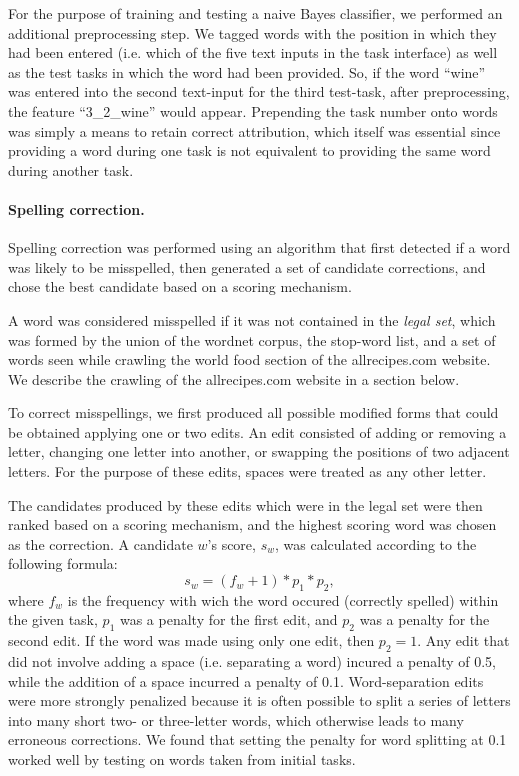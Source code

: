\documentclass[12pt]{article}
\begin{document}
	For the purpose of training and testing a naive Bayes classifier, we 
	performed an additional preprocessing step.  We tagged words with the
	position in which they had been entered (i.e. which of the five text 
	inputs in the task interface) as well as the test tasks in which the word 
	had been provided.
	So, if the word ``wine'' was entered into the second text-input for 
	the third test-task, after preprocessing, the feature ``3\_2\_wine'' would
	appear.  Prepending the task number onto words was simply a means to 
	retain correct attribution, which itself was essential since providing a
	word during one task is not equivalent to providing the same word during 
	another task.  
	
	\paragraph{Spelling correction.}  
	Spelling correction was performed using an algorithm that first detected
	if a word was likely to be misspelled, then generated a set of candidate 
	corrections, and chose the best candidate based on a scoring mechanism.
	
	A word was considered misspelled if it was not contained in the 
	\textit{legal set}, which was formed by the union of
	the wordnet corpus, the stop-word list, and a set of words seen while 
	crawling the world food section of the allrecipes.com website.  We
	describe the crawling of the allrecipes.com website in a section below.

	To correct misspellings, we first produced all possible modified forms 
	that could be obtained applying one or two edits.  An edit consisted of 
	adding or removing a letter, changing one letter into another, or 
	swapping the positions of two adjacent letters.  For the purpose of these 
	edits, spaces were treated as any other letter.

	The candidates produced by these edits which were in the legal set were
	then ranked based on a scoring mechanism, and the highest scoring word
	was chosen as the correction.  A candidate $w$'s score, $s_w$, was 
	calculated according to the following formula:
	\begin{equation}
		s_w = (f_w + 1) * p_1 * p_2,
	\end{equation}
	where $f_w$ is the frequency with wich the word occured (correctly 
	spelled)
	within the given task, $p_1$ was a penalty for the first edit, and
	$p_2$ was a penalty for the second edit.  If the word was made using only
	one edit, then $p_2 = 1$.  Any edit that did not involve adding a space
	(i.e. separating a word) incured a penalty of 0.5, while the addition of
	a space incurred a penalty of 0.1.  Word-separation edits were more 
	strongly penalized because it is often possible to split a series of 
	letters into many short two- or three-letter words, which otherwise leads 
	to many erroneous corrections.  We found that setting the penalty for
	word splitting at 0.1 worked well by testing on words taken from
	initial tasks.
\end{document}
